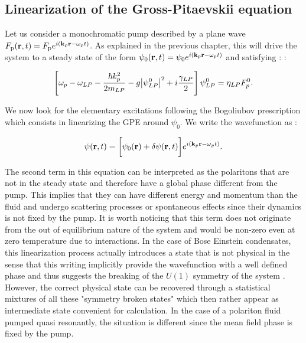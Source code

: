 \subsection{Linearization of the Gross-Pitaevskii equation}
\label{sec:bogo_modes_derivation}
Let us consider a monochromatic pump described by a plane wave $F_{\mathrm{p}}(\mathbf{r},t)=F_{\mathrm{p}}e^{i(\mathbf{k}_p \mathbf{r} -\omega_pt)}$. As explained in the previous chapter, this will drive the system
to a steady state of the form $\psi_0(\mathbf{r},t)=\psi_0e^{i(\mathbf{k}_p \mathbf{r} -\omega_pt)}$ and satisfying : :

\begin{equation}
    \left[\omega_p -\omega_{LP} - \dfrac{\hbar k_p^2}{2 m_{LP}} - g \abs{\psi_{LP}^0}^2 + i \dfrac{\gamma_{LP}}{2} \right] \psi_{LP}^0= \eta_{LP} F_p^0.
    \label{eq:steady_state}
\end{equation}

We now look for the elementary excitations following the Bogoliubov prescription which consists in linearizing the GPE around $\psi_0$. We write the wavefunction as :

\begin{equation}
    \psi(\mathbf{r},t)=\biggl[\psi_0(\mathbf{r})+\delta\psi(\mathbf{r},t)\biggr]e^{i(\mathbf{k}_p \mathbf{r} -\omega_pt)}.
    \label{eq:linearization_ansatz}
\end{equation}

The second term in this equation can be interpreted as the polaritons that are not in the steady state and therefore have a global phase different from the pump. 
This implies that they can have different energy and momentum than the fluid and undergo scattering processes or spontaneous effects since their dynamics is not fixed by the pump. It is 
worth noticing that this term does not originate from the out of equilibrium nature of the system and would be non-zero even at zero temperature due to interactions.
In the case of Bose Einstein condensates, this linearization process actually introduces a state that is not physical in the sense that this writing implicitly provide the wavefunction with a well defined phase and thus suggests the breaking of the $U(1)$ symmetry of the system \cite{castin_bose-einstein_2001}. However, the correct physical state can be recovered through a statistical mixtures of all these "symmetry broken states" which then rather appear 
as intermediate state convenient for calculation. In the case of a polariton fluid pumped quasi resonantly, the situation is different since the mean field phase 
is fixed by the pump. 

\bigskip

